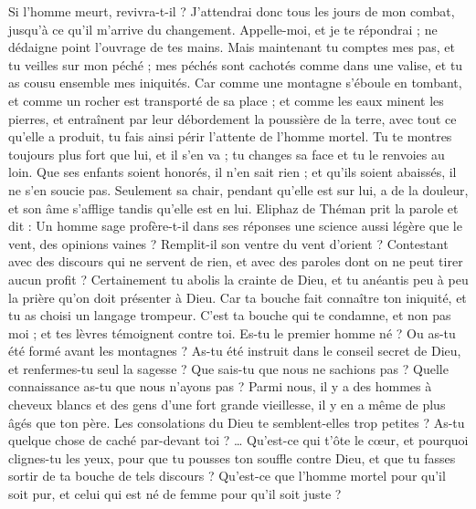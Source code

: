 \begin{multicols}{2}
Si l'homme meurt, revivra-t-il ? J'attendrai donc tous les jours de mon combat, jusqu'à ce qu'il m'arrive du changement.
 Appelle-moi, et je te répondrai ; ne dédaigne point l'ouvrage de tes mains. 
Mais maintenant tu comptes mes pas, et tu veilles sur mon péché ;
mes péchés sont cachotés comme dans une valise, et tu as cousu ensemble mes iniquités.
Car comme une montagne s'éboule en tombant, et comme un rocher est transporté de sa place ; 
 et comme les eaux minent les pierres, et entraînent par leur débordement la poussière de la terre, avec tout ce qu'elle a produit, tu fais ainsi périr l'attente de l'homme mortel.
Tu te montres toujours plus fort que lui, et il s'en va ; tu changes sa face et tu le renvoies au loin.
Que ses enfants soient honorés, il n'en sait rien ; et qu'ils soient abaissés, il ne s'en soucie pas.
Seulement sa chair, pendant qu'elle est sur lui, a de la douleur, et son âme s'afflige tandis qu'elle est en lui.
\VerseOne{}Eliphaz de Théman prit la parole et dit :
Un homme sage profère-t-il dans ses réponses une science aussi légère que le vent, des opinions vaines ? Remplit-il son ventre du vent d'orient ?
Contestant avec des discours qui ne servent de rien, et avec des paroles dont on ne peut tirer aucun profit ?
Certainement tu abolis la crainte de Dieu, et tu anéantis peu à peu la prière qu'on doit présenter à Dieu. 
 Car ta bouche fait connaître ton iniquité, et tu as choisi un langage trompeur. 
C'est ta bouche qui te condamne, et non pas moi ; et tes lèvres témoignent contre toi. 
Es-tu le premier homme né ? Ou as-tu été formé avant les montagnes ?
As-tu été instruit dans le conseil secret de Dieu, et renfermes-tu seul la sagesse ?
Que sais-tu que nous ne sachions pas ? Quelle connaissance as-tu que nous n'ayons pas ?
Parmi nous, il y a des hommes à cheveux blancs et des gens d'une fort grande vieillesse, il y en a même de plus âgés que ton père. 
Les consolations du Dieu te semblent-elles trop petites ? As-tu quelque chose de caché par-devant toi ? …
Qu'est-ce qui t'ôte le cœur, et pourquoi clignes-tu les yeux, 
pour que tu pousses ton souffle contre Dieu, et que tu fasses sortir de ta bouche de tels discours ? 
Qu'est-ce que l'homme mortel pour qu'il soit pur, et celui qui est né de femme pour qu'il soit juste ?

\end{multicols}
